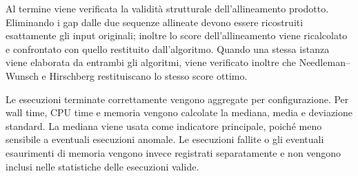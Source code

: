 Al termine viene verificata la validità strutturale dell'allineamento prodotto. Eliminando i gap dalle due sequenze allineate
devono essere ricostruiti esattamente gli input originali; inoltre lo score dell'allineamento viene ricalcolato e confrontato con quello
restituito dall'algoritmo.
Quando una stessa istanza viene elaborata da entrambi gli algoritmi, viene verificato inoltre
che Needleman--Wunsch e Hirschberg restituiscano lo stesso score ottimo.

Le esecuzioni terminate correttamente vengono aggregate per configurazione. Per wall time, CPU time e memoria vengono calcolate la mediana,
media e deviazione standard. La mediana viene usata come indicatore principale, poiché meno sensibile a eventuali esecuzioni anomale. Le esecuzioni
fallite o gli eventuali esaurimenti di memoria vengono invece registrati separatamente e non vengono inclusi nelle statistiche delle esecuzioni valide.
